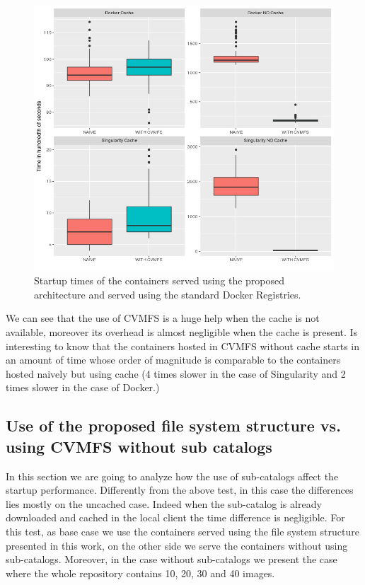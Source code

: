 \begin{figure}[]{}
    \includegraphics[width=\textwidth]{gfx/plot-startup-time}
        \caption{Startup times of the containers served using the proposed architecture and served using the standard Docker Registries.}
        \label{fig:startup-time}
\end{figure}


We can see that the use of CVMFS is a huge help when the cache is not
available, moreover its overhead is almost negligible when the cache is
present. Is interesting to know that the containers hosted in CVMFS without
cache starts in an amount of time whose order of magnitude is comparable to the
containers hosted naively but using cache (4 times slower in the case of
Singularity and 2 times slower in the case of Docker.)

\subsection{Use of the proposed file system structure vs. using CVMFS without sub catalogs}

In this section we are going to analyze how the use of sub-catalogs affect the
startup performance. Differently from the above test, in this case the
differences lies mostly on the uncached case. Indeed when the sub-catalog is
already downloaded and cached in the local client the time difference is
negligible. For this test, as base case we use the containers served using the file
system structure presented in this work, on the other side we serve the
containers without using sub-catalogs. Moreover, in the case without
sub-catalogs we present the case where the whole repository contains 10,
20, 30 and 40 images.

